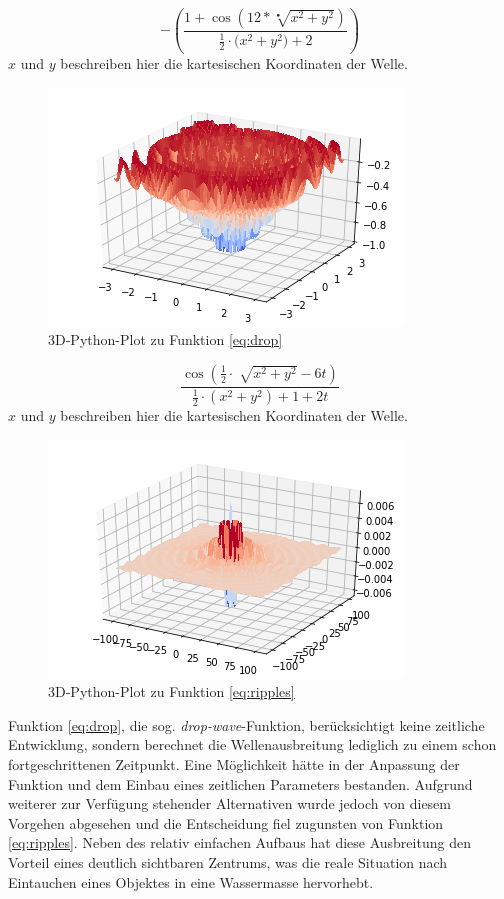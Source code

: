 \documentclass[conference]{IEEEtran}
\begin{document}
\begin{equation}\label{eq:drop}
-(\frac{1+\cos(12*\sqrt[•]{x^{2} + y^{2}})}{\frac{1}{2} \cdot ({x^{2} + y^{2}) + 2}})
\end{equation}
$x$ und $y$ beschreiben hier die kartesischen Koordinaten der Welle.

\begin{figure}[H]
\centerline{\includegraphics[scale=0.75]{img/drop_wave.png}}
\label{fig:drop_wave}
\caption{3D-Python-Plot zu Funktion \eqref{eq:drop}}
\end{figure}

\begin{equation}\label{eq:ripples}
\frac{\cos(\frac{1}{2} \cdot \sqrt[]{x^{2} + y^{2}} - 6t)}{\frac{1}{2} \cdot (x^{2} + y^{2}) + 1 + 2t}
\end{equation}
$x$ und $y$ beschreiben hier die kartesischen Koordinaten der Welle.

\begin{figure}[H]
\centerline{\includegraphics[scale=0.75]{img/ripples.png}}
\label{fig:ripples}
\caption{3D-Python-Plot zu Funktion \eqref{eq:ripples}}
\end{figure}

Funktion \eqref{eq:drop}, die sog. \textit{drop-wave}-Funktion, ber\"ucksichtigt keine zeitliche Entwicklung, sondern berechnet die Wellenausbreitung lediglich zu einem schon fortgeschrittenen Zeitpunkt. Eine M\"oglichkeit h\"atte in der Anpassung der Funktion und dem Einbau eines zeitlichen Parameters bestanden. Aufgrund weiterer zur Verf\"ugung stehender Alternativen wurde jedoch von diesem Vorgehen abgesehen und die Entscheidung fiel zugunsten von Funktion \eqref{eq:ripples}. Neben des relativ einfachen Aufbaus hat diese Ausbreitung den Vorteil eines deutlich sichtbaren Zentrums, was die reale Situation nach Eintauchen eines Objektes in eine Wassermasse hervorhebt. 
\end{document}
